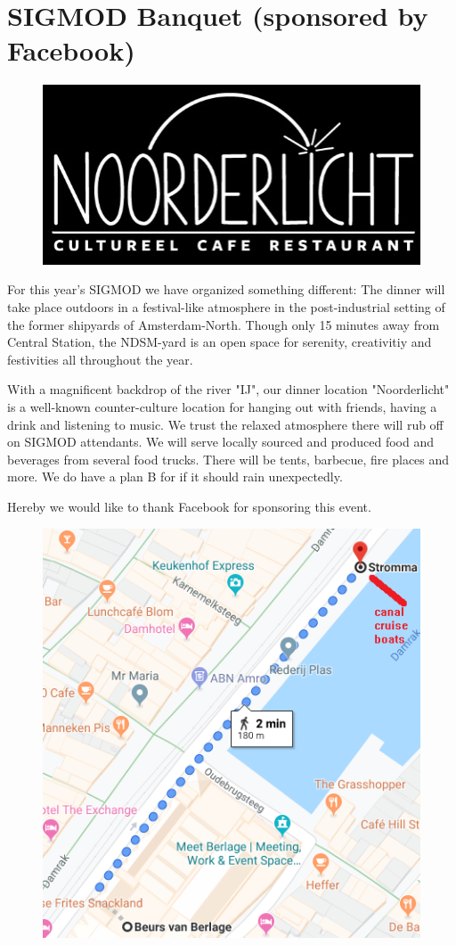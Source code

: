 
\section{SIGMOD Banquet (sponsored by Facebook)}

\begin{figure}[h]
\centering
\includegraphics[width=.5\textwidth]{images/noorderlicht.jpg}
\end{figure}

For this year's SIGMOD we have organized something different: The dinner will take place outdoors in a festival-like atmosphere in the post-industrial setting of the former shipyards of Amsterdam-North. Though only 15 minutes away from Central Station, the NDSM-yard is an open space for serenity, creativitiy and festivities all throughout the year.

With a magnificent backdrop of the river "IJ", our dinner location "Noorderlicht" is a well-known counter-culture location for hanging out with friends, having a drink and listening to music. We trust the relaxed atmosphere there will rub off on SIGMOD attendants. We will serve locally sourced and produced food and beverages from several food trucks. There will be tents, barbecue, fire places and more. We do have a plan B for if it should rain unexpectedly.

Hereby we would like to thank Facebook for sponsoring this event.

\begin{figure}[h]
\centering
\includegraphics[width=.6\textwidth]{images/berlage-stromma.png}
\end{figure}

